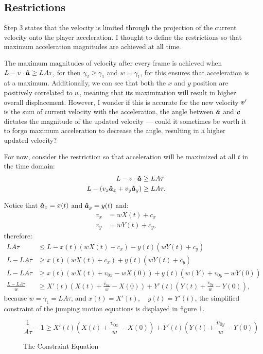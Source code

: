 \subsection{Restrictions}
Step 3 states that the velocity is limited through the projection of the current velocity onto the player acceleration. I thought to define the restrictions so that maximum acceleration magnitudes are achieved at all time.

The maximum magnitudes of velocity after every frame is achieved when $L- v \cdot \boldsymbol{\hat{a}} \ge LA\tau$, for then $\gamma_2 \ge \gamma_1$ and $w = \gamma_1$, for this ensures that acceleration is at a maximum. Additionally, we can see that both the $x$ and $y$ position are positively correlated to $w$, meaning that its maximization will result in higher overall displacement. However, I wonder if this is accurate for the new velocity $\boldsymbol{v}'$ is the sum of current velocity with the acceleration, the angle between $\boldsymbol{\hat{a}}$ and $\boldsymbol{v}$ dictates the magnitude of the updated velocity --- could it sometimes be worth it to forgo maximum acceleration to decrease the angle, resulting in a higher updated velocity?

For now, consider the restriction so that acceleration will be maximized at all $t$ in the time domain:
\begin{align*}
    L - v \cdot \boldsymbol{\hat{a}} &\ge LA\tau\\
    L - (v_x \boldsymbol{\hat{a}}_x + v_y \boldsymbol{\hat{a}}_y) &\ge LA\tau.
\end{align*}

Notice that $\boldsymbol{\hat{a}}_x = x(t)$ and $\boldsymbol{\hat{a}}_y = y(t)$ and:
\begin{align*}
    v_x &= wX(t) + c_x\\
    v_y &= wY(t) + c_y,
\end{align*}
therefore:
\begin{align*}
    LA\tau\ &\le L - x(t)(wX(t)+c_x) - y(t)(wY(t)+c_y)\\
    L - LA\tau &\ge x(t)(wX(t)+c_x) + y(t)(wY(t)+c_y)\\
    L - LA\tau &\ge x(t)(wX(t) + v_{0x} -wX(0)) + y(t)(w(Y) + v_{0y} -wY(0))\\
    \frac{L - LA\tau}{w} &\ge X'(t)(X(t) + \frac{v_{0x}}{w} - X(0)) + Y'(t)(Y(t) + \frac{v_{0y}}{w} -Y(0)),
\end{align*}
because $w=\gamma_1=LA\tau$, and $x(t) = X'(t), \quad y(t) = Y'(t)$, the simplified constraint of the jumping motion equations is displayed in figure \ref{eq:constraint}.
\begin{figure}[H]
    \centering
    \[
        \frac{1}{A\tau} - 1 \ge X'(t)(X(t) + \frac{v_{0x}}{w} - X(0)) + Y'(t)(Y(t) + \frac{v_{0y}}{w} -Y(0))
    \]
    \caption{The Constraint Equation}
    \label{eq:constraint}
\end{figure}

